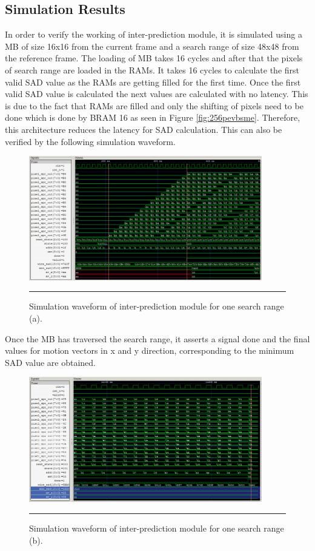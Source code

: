 \subsection{Simulation Results}
In order to verify the working of inter-prediction module, it is simulated using a MB of size 16x16 from the current frame and a search range of size 48x48 from the reference frame.
The loading of MB takes 16 cycles and after that the pixels of search range are loaded in the RAMs. It takes 16 cycles to calculate the first valid SAD value as the RAMs are getting filled for the first time. Once the first valid SAD value is calculated the next values are calculated with no latency. This is due to the fact that RAMs are filled and only the shifting of pixels need to be done which is done by BRAM 16 as seen in Figure \ref{fig:256pevbsme}. Therefore, this architecture reduces the latency for SAD calculation. This can also be verified by the following simulation waveform.
\begin{figure}[H]
	\centering
	\includegraphics[width = 4in]{./Figures/wave3.png}
	\rule{35em}{0.5pt}
	\caption{Simulation waveform of inter-prediction module for one search range (a).}
	\label{fig:wave3}
\end{figure}
Once the MB has traversed the search range, it asserts a signal done and the final values for motion vectors in x and y direction, corresponding to the minimum SAD value are obtained. 
\begin{figure}[H]
	\centering
	\includegraphics[width = 4in]{./Figures/wave2.png}
	\rule{35em}{0.5pt}
	\caption{Simulation waveform of inter-prediction module for one search range (b).}
	\label{fig:wave2}
\end{figure}

